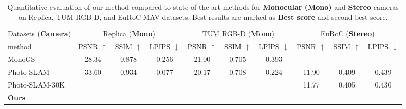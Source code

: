 \begin{table}
\footnotesize
  \centering
   \setlength\tabcolsep{10pt} 
  \begin{tabular}{@{}l|ccc|ccc|ccc} %
    \hline   
   Datasets ({\bf Camera}) & \multicolumn{3}{c|}{Replica ({\bf Mono})} & \multicolumn{3}{c|}{TUM RGB-D ({\bf Mono})} & \multicolumn{3}{c}{EuRoC ({\bf Stereo})} \\
   method &  PSNR $\uparrow$ &SSIM $\uparrow$   &LPIPS $\downarrow$  
        &  PSNR $\uparrow$ &SSIM $\uparrow$   &LPIPS  $\downarrow$  
        &  PSNR $\uparrow$ &SSIM $\uparrow$   &LPIPS $\downarrow$  \\
    \hline  
       MonoGS \cite{MonoGS2024} & 28.34 & 0.878 & 0.256   &	21.00 &	0.705 & 0.393  & \cellcolor{lightorange}{22.60} & \cellcolor{lightorange}{0.789}  &	\cellcolor{lightorange}{0.274}  \\
       Photo-SLAM \cite{Photo-SLAM2024}  & 33.60 & 0.934 & 0.077   &	20.17 &	0.708 & 0.224  & 11.90  & 0.409 & 0.439 \\
       Photo-SLAM-30K & \cellcolor{lightorange}{36.70} & \cellcolor{lightorange}{0.952} & \cellcolor{lightorange}{0.046}  & \cellcolor{lightorange}{21.06} & \cellcolor{lightorange}{0.733} & \cellcolor{lightorange}{0.186} 	& 11.77 & 0.405 & 0.430\\
       \hline
       {\bf Ours} & \cellcolor{lightred}{\bf 37.71} &\cellcolor{lightred}{\bf 0.963} & \cellcolor{lightred}{\bf 0.041}  &\cellcolor{lightred}{\bf 24.52} &\cellcolor{lightred}{\bf 0.823}  & \cellcolor{lightred}{\bf 0.153} & \cellcolor{lightred}{\bf 23.64} & \cellcolor{lightred}{\bf0.791} & \cellcolor{lightred}{\bf 0.182} \\
   \hline
  \end{tabular}
  \caption{Quantitative evaluation of our method compared to state-of-the-art methods for {\bf Monocular (Mono)} and {\bf Stereo} cameras on Replica, TUM RGB-D, and EuRoC MAV datasets. Best results are marked as  \colorbox{lightred}{\bf Best score} and \colorbox{lightorange}{second best score}.}
  \label{tab:rendering_mono_stereo}
\end{table}

